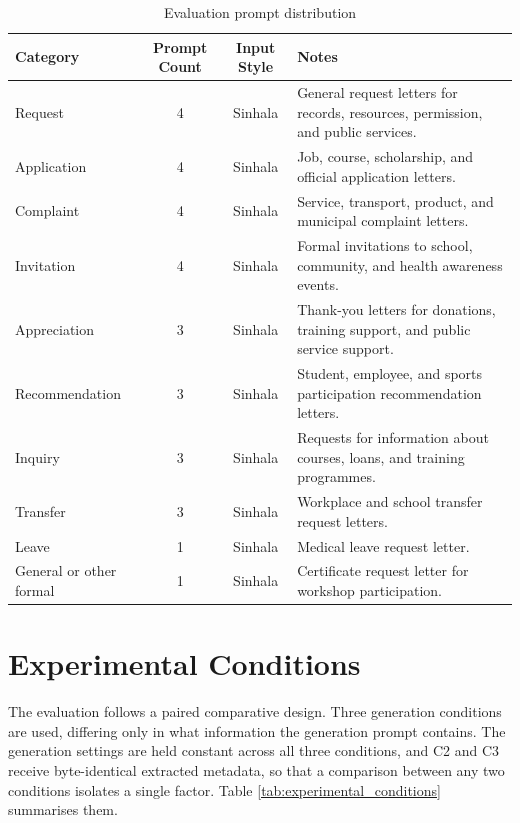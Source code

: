 \documentclass[12pt]{uomthesis}
\begin{document}
\begin{table}[!htbp]
\centering
\small
\begin{tabularx}{\linewidth}{@{}lccX@{}}
\toprule
\textbf{Category} & \textbf{Prompt Count} & \textbf{Input Style} & \textbf{Notes} \\
\midrule
Request & 4 & Sinhala & General request letters for records, resources, permission, and public services. \\
Application & 4 & Sinhala & Job, course, scholarship, and official application letters. \\
Complaint & 4 & Sinhala & Service, transport, product, and municipal complaint letters. \\
Invitation & 4 & Sinhala & Formal invitations to school, community, and health awareness events. \\
Appreciation & 3 & Sinhala & Thank-you letters for donations, training support, and public service support. \\
Recommendation & 3 & Sinhala & Student, employee, and sports participation recommendation letters. \\
Inquiry & 3 & Sinhala & Requests for information about courses, loans, and training programmes. \\
Transfer & 3 & Sinhala & Workplace and school transfer request letters. \\
Leave & 1 & Sinhala & Medical leave request letter. \\
General or other formal & 1 & Sinhala & Certificate request letter for workshop participation. \\
\bottomrule
\end{tabularx}
\caption{Evaluation prompt distribution}
\label{tab:evaluation_prompt_distribution}
\end{table}

\section{Experimental Conditions}

The evaluation follows a paired comparative design. Three generation conditions are used, differing only in what information the generation prompt contains. The generation settings are held constant across all three conditions, and C2 and C3 receive byte-identical extracted metadata, so that a comparison between any two conditions isolates a single factor. Table \ref{tab:experimental_conditions} summarises them.
\end{document}
